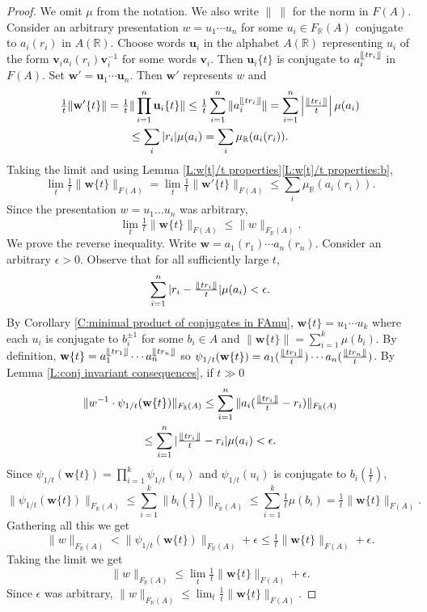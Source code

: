 \documentclass[12pt]{amsart}
\theoremstyle{definition}
\def\RR{\ensuremath{\mathbb{R}}}
\newcommand{\B}[1]{\mathbf{#1}}
\newcommand{\trc}[1]{\{ #1 \}}   %
\def\Free{F}
\newcommand{\myfloor}[1]{\llfloor #1 \rrfloor}
\begin{document}
\begin{proof}
We omit $\mu$ from the notation.
We also write $\| \ \|$ for the norm in $\Free(A)$.
Consider an arbitrary presentation $w=u_1\cdots u_n$ for some $u_i \in \Free_\RR(A)$ conjugate to $a_i(r_i)$ in $A(\RR)$.
Choose words $\B u_i$ in the alphabet $A(\RR)$ representing $u_i$ of the form $\B v_i a_i(r_i) \B v_i^{-1}$ for some words $\B v_i$.
Then $\B u_i\trc{t}$ is conjugate to $a_i^{\myfloor{tr_i}}$ in $\Free(A)$.
Set $\B w'=\B u_1 \cdots \B u_n$.
Then $\B w'$ represents $w$ and
\begin{multline*}
\tfrac{1}{t} \| \B w'\trc{t}\| =
\tfrac{1}{t} \| \prod_{i=1}^n \B u_i\trc{t}\| \leq
\tfrac{1}{t} \sum_{i=1}^n \|a_i^{\myfloor{tr_i}}\| =
\sum_{i=1}^n \left| \tfrac{\myfloor{tr_i}}{t}\right| \mu(a_i) 
\\
\leq
\sum_i |r_i| \mu(a_i)=
\sum_i \mu_{\RR}(a_i(r_i)).
\end{multline*}
Taking the limit and using Lemma \ref{L:w[t]/t properties}\ref{L:w[t]/t properties:b},
\[
\lim_t \tfrac{1}{t}\|\B w\trc{t}\|_{\Free(A)} = \lim_t \tfrac{1}{t}\|\B w'\trc{t}\|_{\Free(A)} \leq \sum_i \mu_{\RR}(a_i(r_i)).
\]
Since the presentation $w=u_1\dots u_n$ was arbitrary,
\[
\lim_t \tfrac{1}{t}\|\B w\trc{t}\|_{\Free(A)} \leq \| w\|_{\Free_\RR(A)}.
\]
We prove the reverse inequality.
Write $\B w=a_1(r_1) \cdots a_n(r_n)$.
Consider an arbitrary $\epsilon>0$.
Observe that  for all sufficiently large $t$,
\[
\sum_{i=1}^n |r_i-\tfrac{\myfloor{tr_i}}{t}|\mu(a_i)< \epsilon.
\]
By Corollary \ref{C:minimal product of conjugates in FAmu}, $\B w\trc{t} = u_1 \cdots u_k$ where each $u_i$ is conjugate to $b_i^{\pm 1}$ for some $b_i \in A$ and $\| \B w\trc{t}\|= \sum_{i=1}^k \mu(b_i)$.
By definition, $\B w\trc{t} = a_1^{\myfloor{tr_1}}\cdots a_n^{\myfloor{tr_n}}$ so $\psi_{1/t}(\B w\trc{t})=a_1(\tfrac{\myfloor{tr_1}}{t}) \cdots a_n(\tfrac{\myfloor{tr_n}}{t})$.
By Lemma \ref{L:conj invariant consequences}, if $t \gg 0$
\begin{multline*}
\| w^{-1} \cdot \psi_{1/t}(\B w\trc{t})\|_{\Free_\RR(A)} \leq
\sum_{i=1}^n \| a_i(\tfrac{\myfloor{tr_i}}{t} - r_i)\|_{\Free_\RR(A)} 
\\
\leq
\sum_{i=1}^n | \tfrac{\myfloor{tr_i}}{t} - r_i| \mu(a_i) < \epsilon.
\end{multline*}
Since $\psi_{1/t}(\B w\trc{t})=\prod_{i=1}^k\psi_{1/t}(u_i)$ and $\psi_{1/t}(u_i)$ is conjugate to $b_i(\tfrac{1}{t})$,
\[
\|\psi_{1/t}(\B w\trc{t})\|_{\Free_\RR(A)} \leq \sum_{i=1}^k \|b_i(\tfrac{1}{t})\|_{\Free_\RR(A)} \leq \sum_{i=1}^k \tfrac{1}{t} \mu(b_i) = \tfrac{1}{t} \|\B w\trc{t}\|_{\Free(A)}.
\]
Gathering all this we get
\[
\| w\|_{\Free_\RR(A)} < \| \psi_{1/t}(\B w\trc{t})\|_{\Free_\RR(A)} + \epsilon \leq \tfrac{1}{t} \|\B w\trc{t}\|_{\Free(A)}+\epsilon.
\]
Taking the limit we get 
\[
\| w\|_{\Free_\RR(A)} \leq \lim_t \tfrac{1}{t} \|\B w\trc{t}\|_{\Free(A)}+\epsilon.
\]
Since $\epsilon$ was arbitrary, $\| w\|_{\Free_\RR(A)} \leq \lim_t \tfrac{1}{t} \|\B w\trc{t}\|_{\Free(A)}$.
\end{proof}
\end{document}
